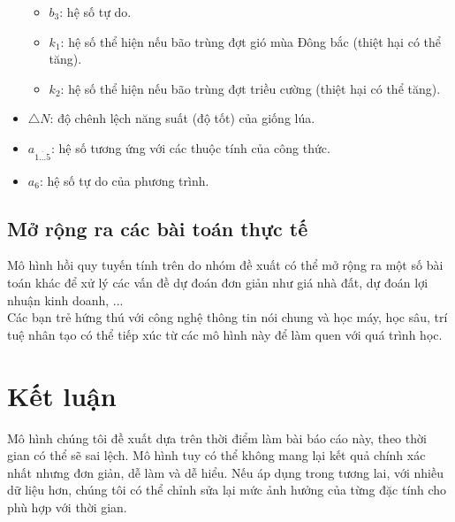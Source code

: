 \documentclass[12pt]{report}
\begin{document}
\begin{flushleft}
\begin{itemize}
\begin{itemize}
			\item $b_{3}$: hệ số tự do.

			\item $k_{1}$: hệ số thể hiện nếu bão trùng đợt gió mùa Đông bắc (thiệt hại có thể tăng).

			\item $k_{2}$: hệ số thể hiện nếu bão trùng đợt triều cường (thiệt hại có thể tăng).
		\end{itemize}

		\item $\triangle{N}$: độ chênh lệch năng suất (độ tốt) của giống lúa.

		\item $a^{}_{\overline{1 \dots 5}}$: hệ số tương ứng với các thuộc tính của công thức.

		\item $a_{6}$: hệ số tự do của phương trình.
	\end{itemize}
\end{flushleft}

\subsection{Mở rộng ra các bài toán thực tế}
\begin{flushleft}
	Mô hình hồi quy tuyến tính trên do nhóm đề xuất có thể mở rộng ra một số bài toán khác để xử lý các vấn đề dự đoán đơn giản như giá nhà đất, dự đoán lợi nhuận kinh doanh, ...
	\\[\baselineskip]

	Các bạn trẻ hứng thú với công nghệ thông tin nói chung và học máy, học sâu, trí tuệ nhân tạo có thể tiếp xúc từ các mô hình này để làm quen với quá trình học.
\end{flushleft}

\section{Kết luận} %
\label{sec:kết_luận}
\begin{flushleft}
	Mô hình chúng tôi đề xuất dựa trên thời điểm làm bài báo cáo này, theo thời gian có thể sẽ sai lệch. Mô hình tuy có thể không mang lại kết quả chính xác nhất nhưng đơn giản, dễ làm và dễ hiểu. Nếu áp dụng trong tương lai, với nhiều dữ liệu hơn, chúng tôi có thể chỉnh sửa lại mức ảnh hưởng của từng đặc tính cho phù hợp với thời gian.
\end{flushleft}
\end{document}
